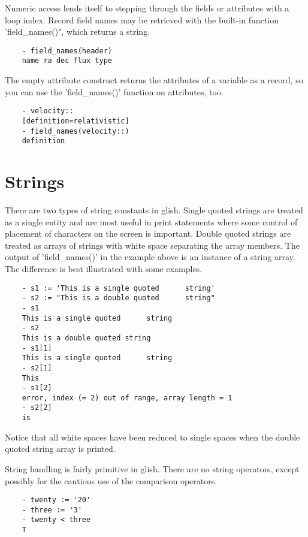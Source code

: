Numeric access lends itself to stepping through the fields or attributes
with a loop index.  Record field names may be retrieved with the built-in
function 'field\_names()", which returns a string.

\begin{verbatim}
	- field_names(header)
	name ra dec flux type
\end{verbatim}

The empty attribute construct returns the attributes of a variable as a
record, so you can use the 'field\_names()' function on attributes, too.

\begin{verbatim}
	- velocity::
	[definition=relativistic]
	- field_names(velocity::)
	definition
\end{verbatim}


\section{Strings}

    There are two types of string constants in glish.  Single quoted
strings are treated as a single entity and are most useful in print
statements where some control of placement of characters on the screen is
important.  Double quoted strings are treated as arrays of strings with
white space separating the array members.  The output of 'field\_names()' in
the example above is an instance of a string array.  The difference is best
illustrated with some examples.

\begin{verbatim}
	- s1 := 'This is a single quoted      string'
	- s2 := "This is a double quoted      string"
	- s1
	This is a single quoted      string 
	- s2
	This is a double quoted string 
	- s1[1]
	This is a single quoted      string 
	- s2[1]
	This 
	- s1[2]
	error, index (= 2) out of range, array length = 1 
	- s2[2]
	is 
\end{verbatim}

Notice that all white spaces have been reduced to single spaces when the
double quoted string array is printed.

    String handling is fairly primitive in glish.  There are no string
operators, except possibly for the cautious use of the comparison
operators.

\begin{verbatim}
	- twenty := '20'
	- three := '3'
	- twenty < three
	T
\end{verbatim}


